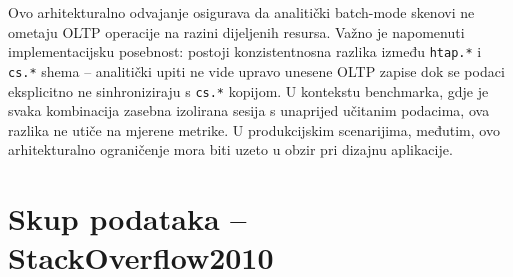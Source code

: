 Ovo arhitekturalno odvajanje osigurava da analitički batch-mode skenovi ne ometaju OLTP operacije na razini dijeljenih resursa. Važno je napomenuti implementacijsku posebnost: postoji konzistentnosna razlika između \texttt{htap.*} i \texttt{cs.*} shema -- analitički upiti ne vide upravo unesene OLTP zapise dok se podaci eksplicitno ne sinhroniziraju s \texttt{cs.*} kopijom. U kontekstu benchmarka, gdje je svaka kombinacija zasebna izolirana sesija s unaprijed učitanim podacima, ova razlika ne utiče na mjerene metrike. U produkcijskim scenarijima, međutim, ovo arhitekturalno ograničenje mora biti uzeto u obzir pri dizajnu aplikacije.

\begin{table}[htbp]
\centering
\caption{Pregled arhitekturalnih karakteristika četiri konfiguracijske strategije}
\label{tab:konfiguracije}
\small
{}
\end{table}

\section{Skup podataka -- StackOverflow2010}
\label{sec:skup_podataka}

